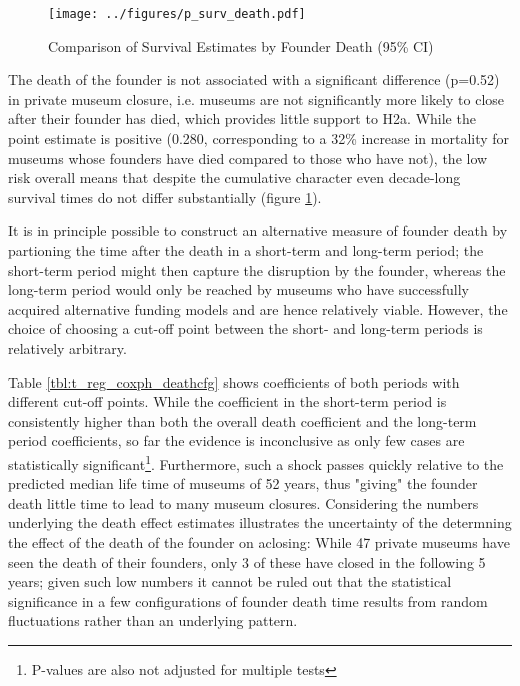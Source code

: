 \documentclass[12pt]{article}
\begin{document}
\begin{figure}[htbp]
\centering
\texttt{[image: ../figures/p\_surv\_death.pdf]}
\caption{\label{fig:p_surv_death}Comparison of Survival Estimates by Founder Death (95\% CI)}
\end{figure}

The death of the founder is not associated with a significant difference (p=0.52) in private museum closure, i.e. museums are not significantly more likely to close after their founder has died, which provides little support to H2a.
While the point estimate is positive (0.280, corresponding to a  32\% increase in mortality for museums whose founders have died compared to those who have not), the low risk overall means that despite the cumulative character even decade-long survival times do not differ substantially (figure \ref{fig:p_surv_death}).


It is in principle possible to construct an alternative measure of founder death by partioning the time after the death in a short-term and long-term period; the short-term period might then capture the disruption by the founder, whereas the long-term period would only be reached by museums who have successfully acquired alternative funding models and are hence relatively viable.
However, the choice of choosing a cut-off point between the short- and long-term periods is relatively arbitrary.


Table \ref{tbl:t_reg_coxph_deathcfg} shows coefficients of both periods with different cut-off points.
While the coefficient in the short-term period is consistently higher than both the overall death coefficient and the long-term period coefficients, so far the evidence is inconclusive as only few cases are statistically significant\footnote{P-values are also not adjusted for multiple tests}.
Furthermore, such a shock passes quickly relative to the predicted median life time of museums of 52 years, thus "giving" the founder death little time to lead to many museum closures. 
Considering the numbers underlying the death effect estimates illustrates the uncertainty of the determning the effect of the death of the founder on aclosing: 
While 47 private museums have seen the death of their founders, only 3 of these have closed in the following 5 years; given such low numbers it cannot be ruled out that the statistical significance in a few configurations of founder death time results from random fluctuations rather than an underlying pattern.
\end{document}
